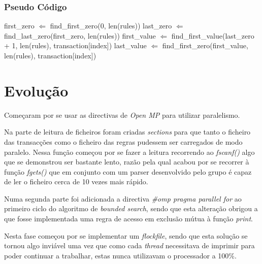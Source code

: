 \documentclass[a4paper]{article}
\begin{document}
\subsubsection{Pseudo Código}
\begin{algorithm}
	\begin{algorithmic}

				\ENDIF

				\STATE first\_zero $\Leftarrow$ find\_first\_zero(0, len(rules))
				\STATE last\_zero $\Leftarrow$ find\_last\_zero(first\_zero, len(rules))
				\STATE first\_value $\Leftarrow$ find\_first\_value(last\_zero + 1, len(rules), transaction[index])
				\STATE last\_value $\Leftarrow$ find\_first\_zero(first\_value, len(rules), transaction[index])

				\ENDIF
				\ENDIF
			\ENDFOR
		\ENDFOR
	\end{algorithmic}
\end{algorithm}
\clearpage

\section{Evolução}
\indent \indent Começaram por se usar as directivas de \textit{Open MP} para utilizar paralelismo. 

Na parte de leitura de ficheiros foram criadas \textit{sections} para que tanto o ficheiro das transacções como o ficheiro das regras pudessem ser carregados de modo paralelo. Nessa função começou por se fazer a leitura recorrendo ao \textit{fscanf()} algo que se demonstrou ser bastante lento, razão pela qual acabou por se recorrer à função \textit{fgets()} que em conjunto com um parser desenvolvido pelo grupo é capaz de ler o ficheiro cerca de 10 vezes mais rápido.

Numa segunda parte foi adicionada a directiva \textit{\#omp pragma parallel for} ao primeiro ciclo do algoritmo de \textit{bounded search}, sendo que esta alteração obrigou a que fosse implementada uma regra de acesso em exclusão mútua à função \textit{print}.

Nesta fase começou por se implementar um \textit{flockfile}, sendo que esta solução se tornou algo inviável uma vez que como cada \textit{thread} necessitava de imprimir para poder continuar a trabalhar, estas nunca utilizavam o processador a 100\%.
\end{document}
